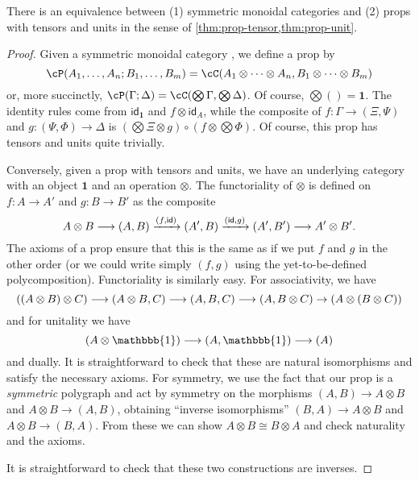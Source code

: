 \documentclass{book}
\def\idfunc{\mathsf{id}}
\def\unit{\mathbbb{1}}%
\def\one{\mathbf{1}}
\let\tensor\otimes
\let\bigtensor\bigotimes
\begin{document}
\begin{thm}\label{thm:prop-smc}
  There is an equivalence between (1) symmetric monoidal categories and (2) props with tensors and units in the sense of \cref{thm:prop-tensor,thm:prop-unit}.
\end{thm}
\begin{proof}
  Given a symmetric monoidal category \cC, we define a prop \cP by
  \[ \cP(A_1,\dots,A_n ; B_1,\dots,B_m) = \cC(A_1\tensor \cdots\tensor A_n, B_1\tensor\cdots\tensor B_m)\]
  or, more succinctly, $\cP(\Gamma;\Delta) = \cC(\bigtensor\Gamma, \bigtensor\Delta)$.
  Of course, $\bigtensor() = \one$.
  The identity rules come from $\idfunc_\one$ and $f\tensor \idfunc_A$, while the composite of $f:\Gamma\to (\Xi,\Psi)$ and $g:(\Psi,\Phi)\to \Delta$ is $(\bigtensor\Xi \tensor g) \circ (f\tensor \bigtensor \Phi)$.
  Of course, this prop has tensors and units quite trivially.

  Conversely, given a prop with tensors and units, we have an underlying category with an object $\one$ and an operation $\tensor$.
  The functoriality of $\tensor$ is defined on $f:A\to A'$ and $g:B\to B'$ as the composite
  \[ A\tensor B \too (A,B) \xto{(f,\idfunc)} (A',B) \xto{(\idfunc,g)} (A',B') \too A'\tensor B'. \]
  The axioms of a prop ensure that this is the same as if we put $f$ and $g$ in the other order (or we could write simply $(f,g)$ using the yet-to-be-defined polycomposition).
  Functoriality is similarly easy.
  For associativity, we have
  \[ ((A\tensor B)\tensor C) \too (A\tensor B,C) \too (A,B,C) \too (A,B\tensor C) \to (A\tensor (B\tensor C)) \]
  and for unitality we have
  \[ (A\tensor \unit) \too (A,\unit) \too (A) \]
  and dually.
  It is straightforward to check that these are natural isomorphisms and satisfy the necessary axioms.
  For symmetry, we use the fact that our prop is a \emph{symmetric} polygraph and act by symmetry on the morphisms $(A,B)\to A\tensor B$ and $A\tensor B\to (A,B)$, obtaining ``inverse isomorphisms'' $(B,A) \to A\tensor B$ and $A\tensor B \to (B,A)$.
  From these we can show $A\tensor B \cong B\tensor A$ and check naturality and the axioms.

  It is straightforward to check that these two constructions are inverses.
\end{proof}
\end{document}
